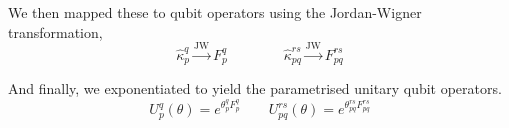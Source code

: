 We then mapped these to qubit operators using the Jordan-Wigner transformation,
\begin{equation*}
    \hat\kappa_p^q \xrightarrow{\text{JW}} F_p^q \qquad\qquad
    \hat\kappa_{pq}^{rs} \xrightarrow{\text{JW}} F_{pq}^{rs}
\end{equation*}

And finally, we exponentiated to yield the parametrised unitary qubit operators.
\begin{equation*}
    U^q_p (\theta) = e^{\theta^q_p F_p^q} \qquad
    U^{rs}_{pq}(\theta) = e^{\theta_{pq}^{rs} F_{pq}^{rs}}
\end{equation*}

